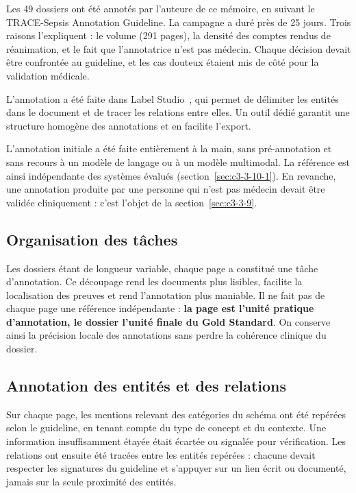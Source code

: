 Les 49 dossiers ont été annotés par l’auteure de ce mémoire, en suivant le TRACE-Sepsis Annotation Guideline. La campagne a duré près de 25 jours. Trois raisons l’expliquent : le volume (291 pages), la densité des comptes rendus de réanimation, et le fait que l’annotatrice n’est pas médecin. Chaque décision devait être confrontée au guideline, et les cas douteux étaient mis de côté pour la validation médicale.

L’annotation a été faite dans Label Studio~\cite{labelstudio}, qui permet de délimiter les entités dans le document et de tracer les relations entre elles. Un outil dédié garantit une structure homogène des annotations et en facilite l’export.

L’annotation initiale a été faite entièrement à la main, sans pré-annotation et sans recours à un modèle de langage ou à un modèle multimodal. La référence est ainsi indépendante des systèmes évalués (section~\ref{sec:c3-3-10-1}). En revanche, une annotation produite par une personne qui n’est pas médecin devait être validée cliniquement : c’est l’objet de la section~\ref{sec:c3-3-9}.

\subsection{Organisation des tâches}\label{sec:c3-3-7-3}

Les dossiers étant de longueur variable, chaque page a constitué une tâche d’annotation. Ce découpage rend les documents plus lisibles, facilite la localisation des preuves et rend l’annotation plus maniable. Il ne fait pas de chaque page une référence indépendante : \textbf{la page est l’unité pratique d’annotation, le dossier l’unité finale du Gold Standard}. On conserve ainsi la précision locale des annotations sans perdre la cohérence clinique du dossier.

\subsection{Annotation des entités et des relations}\label{sec:c3-3-7-4}

Sur chaque page, les mentions relevant des catégories du schéma ont été repérées selon le guideline, en tenant compte du type de concept et du contexte. Une information insuffisamment étayée était écartée ou signalée pour vérification. Les relations ont ensuite été tracées entre les entités repérées : chacune devait respecter les signatures du guideline et s’appuyer sur un lien écrit ou documenté, jamais sur la seule proximité des entités.

